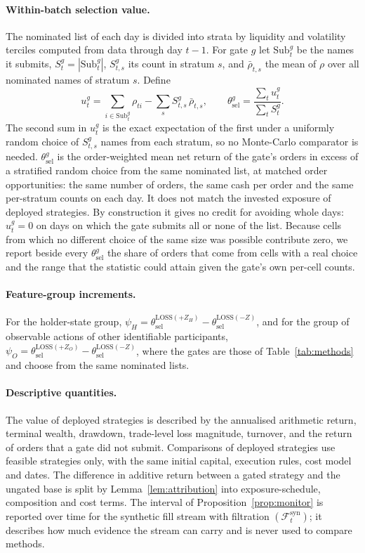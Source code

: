 \documentclass[11pt]{article}
\theoremstyle{remark}
\newcommand{\cF}{\mathcal{F}}
\newcommand{\thetasel}{\theta_{\mathrm{sel}}}
\newcommand{\ZH}{Z_H}
\newcommand{\ZO}{Z_O}
\newcommand{\Fsyn}{\cF_t^{\mathrm{syn}}}
\begin{document}
\paragraph{Within-batch selection value.}
The nominated list of each day is divided into strata by liquidity and volatility terciles
computed from data through day $t-1$. For gate $g$ let $\mathrm{Sub}_t^g$ be the names it
submits, $S_t^g=|\mathrm{Sub}_t^g|$, $S_{t,s}^g$ its count in stratum $s$, and
$\bar\rho_{t,s}$ the mean of $\rho$ over all nominated names of stratum $s$. Define
\[
u_t^g=\sum_{i\in\mathrm{Sub}_t^g}\rho_{ti}-\sum_sS_{t,s}^g\,\bar\rho_{t,s},
\qquad
\thetasel^g=\frac{\sum_tu_t^g}{\sum_tS_t^g}.
\]
The second sum in $u_t^g$ is the exact expectation of the first under a uniformly random choice
of $S_{t,s}^g$ names from each stratum, so no Monte-Carlo comparator is needed. $\thetasel^g$ is
the order-weighted mean net return of the gate's orders in excess of a stratified random choice
from the same nominated list, at matched order opportunities: the same number of orders, the
same cash per order and the same per-stratum counts on each day. It does not match the invested
exposure of deployed strategies. By construction it gives no credit for avoiding whole days:
$u_t^g=0$ on days on which the gate submits all or none of the list. Because cells from which no
different choice of the same size was possible contribute zero, we report beside every
$\thetasel^g$ the share of orders that come from cells with a real choice and the range that
the statistic could attain given the gate's own per-cell counts.

\paragraph{Feature-group increments.}
For the holder-state group, $\psi_H=\thetasel^{\mathrm{LOSS}(+\ZH)}-\thetasel^{\mathrm{LOSS}(-Z)}$,
and for the group of observable actions of other identifiable participants,
$\psi_O=\thetasel^{\mathrm{LOSS}(+\ZO)}-\thetasel^{\mathrm{LOSS}(-Z)}$, where the gates are those
of Table~\ref{tab:methods} and choose from the same nominated lists.

\paragraph{Descriptive quantities.}
The value of deployed strategies is described by the annualised arithmetic return, terminal
wealth, drawdown, trade-level loss magnitude, turnover, and the return of orders that a gate did
not submit. Comparisons of deployed strategies use feasible strategies only, with the same
initial capital, execution rules, cost model and dates. The difference in additive return
between a gated strategy and the ungated base is split by Lemma~\ref{lem:attribution} into
exposure-schedule, composition and cost terms. The interval of Proposition~\ref{prop:monitor} is
reported over time for the synthetic fill stream with filtration $(\Fsyn)$; it describes how
much evidence the stream can carry and is never used to compare methods.
\end{document}
